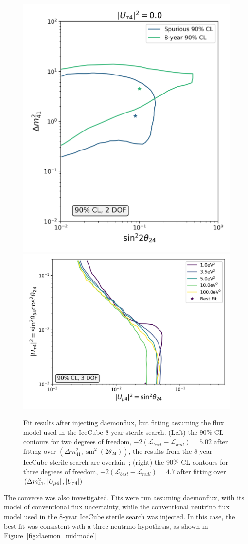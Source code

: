 \documentclass[main.tex]{subfiles}
\begin{document}
\begin{figure}  
    \centering
    \includegraphics[width=0.45\linewidth]{figures/track_daemon_mismodel_Realization_daemon_Asimov_sterile_0_cl0.9_dof2.png}
    \includegraphics[width=0.45\linewidth]{figures/track_daemon_mismodel_nomeow_Realization_daemon_Asimov_sterile_0_cl0.9_dof3.png}
    \caption{Fit results after injecting daemonflux, but fitting assuming the flux model used in the IceCube 8-year sterile search. (Left) the 90\% CL contours for two degrees of freedom, $-2(\mathcal{L}_{best}-\mathcal{L}_{null})=5.02$ after fitting over $(\Delta m_{41}^{2}, \sin^{2}(2\theta_{24}))$, the results from the 8-year IceCube sterile search are overlain~\cite{Aartsen_2020, Aartsen_2020_prd}; (right) the 90\% CL contours for three degrees of freedom, $-2(\mathcal{L}_{best}-\mathcal{L}_{null})=4.7$ after fitting over $(\Delta m_{41}^{2}, \left| U_{\mu4} \right|, \left| U_{\tau 4} \right|)$}\label{fig:uhoh_mismodel_worse}
\end{figure}

The converse was also investigated.
Fits were run assuming daemonflux, with its model of conventional flux uncertainty, while the conventional neutrino flux model used in the 8-year IceCube sterile search was injected. 
In this case, the best fit was consistent with a three-neutrino hypothesis, as shown in Figure~\ref{fig:daemon_midmodel}
\end{document}
